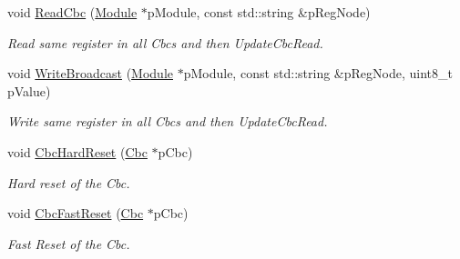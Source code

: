 \begin{DoxyCompactItemize}
void \hyperlink{class_ph2___hw_interface_1_1_cbc_interface_a247b9d4df6f8f85d43d383124994d88a}{Read\-Cbc} (\hyperlink{class_ph2___hw_description_1_1_module}{Module} $\ast$p\-Module, const std\-::string \&p\-Reg\-Node)
\begin{DoxyCompactList}\small\item\em Read same register in all Cbcs and then Update\-Cbc\-Read. \end{DoxyCompactList}\item 
void \hyperlink{class_ph2___hw_interface_1_1_cbc_interface_af4a7fb33df95b0052bf5046910676aec}{Write\-Broadcast} (\hyperlink{class_ph2___hw_description_1_1_module}{Module} $\ast$p\-Module, const std\-::string \&p\-Reg\-Node, uint8\-\_\-t p\-Value)
\begin{DoxyCompactList}\small\item\em Write same register in all Cbcs and then Update\-Cbc\-Read. \end{DoxyCompactList}\item 
void \hyperlink{class_ph2___hw_interface_1_1_cbc_interface_a0e9a7f5c0a444cb8ca14f3a90cd9e759}{Cbc\-Hard\-Reset} (\hyperlink{class_ph2___hw_description_1_1_cbc}{Cbc} $\ast$p\-Cbc)
\begin{DoxyCompactList}\small\item\em Hard reset of the Cbc. \end{DoxyCompactList}\item 
void \hyperlink{class_ph2___hw_interface_1_1_cbc_interface_ae2166f5bd24481d88bdd015d1db08051}{Cbc\-Fast\-Reset} (\hyperlink{class_ph2___hw_description_1_1_cbc}{Cbc} $\ast$p\-Cbc)
\begin{DoxyCompactList}\small\item\em Fast Reset of the Cbc. \end{DoxyCompactList}\end{DoxyCompactItemize}

